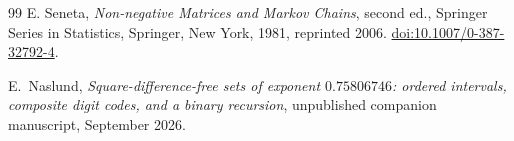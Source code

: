 \documentclass[11pt]{article}
\theoremstyle{definition}
\theoremstyle{remark}
\begin{document}
\begin{thebibliography}{99}
E. Seneta,
\emph{Non-negative Matrices and Markov Chains}, second ed.,
Springer Series in Statistics, Springer, New York, 1981,
reprinted 2006.
\href{https://doi.org/10.1007/0-387-32792-4}{doi:10.1007/0-387-32792-4}.


E.~Naslund,
\emph{Square-difference-free sets of exponent $0.75806746$: ordered
intervals, composite digit codes, and a binary recursion},
unpublished companion manuscript, September 2026.

\end{thebibliography}

\endgroup
\end{document}
